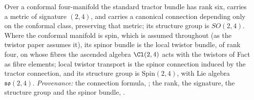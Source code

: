 Over a conformal four-manifold the standard tractor bundle has rank six, carries a metric of signature $(2,4)$, and carries a canonical connection depending only on the conformal class, preserving that metric; its structure group is $SO(2,4)$. Where the conformal manifold is spin, which is assumed throughout (as the twistor paper assumes it), its spinor bundle is the local twistor bundle, of rank four, on whose fibres the ascended algebra $\Cl(2,4)$ acts with the twistors of Fact  as fibre elements; local twistor transport is the spinor connection induced by the tractor connection, and its structure group is $\mathrm{Spin}(2,4)$, with Lie algebra $\mathfrak{so}(2,4)$. \emph{Provenance:} the connection formula, \cite[Fact~4.1]{ButlerT6}; the rank, the signature, the structure group and the spinor bundle, \cite[Fact~4.9, Prop.~4.10]{ButlerT9}.

